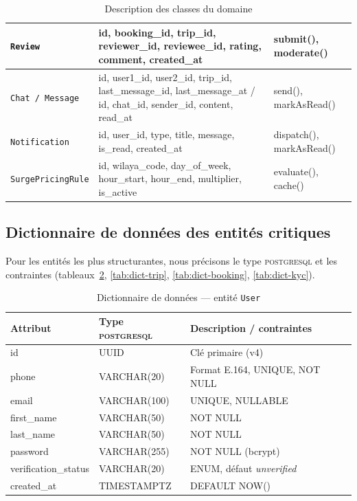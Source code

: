 \documentclass[12pt, a4paper, oneside]{report}
\begin{document}
\begin{table}[H]
\begin{tabularx}{\textwidth}{|l|X|X|}
\hline
\texttt{Review} & id, booking\_id, trip\_id, reviewer\_id, reviewee\_id, rating, comment, created\_at & submit(), moderate() \\
\hline
\texttt{Chat / Message} & id, user1\_id, user2\_id, trip\_id, last\_message\_id, last\_message\_at / id, chat\_id, sender\_id, content, read\_at & send(), markAsRead() \\
\hline
\texttt{Notification} & id, user\_id, type, title, message, is\_read, created\_at & dispatch(), markAsRead() \\
\hline
\texttt{SurgePricingRule} & id, wilaya\_code, day\_of\_week, hour\_start, hour\_end, multiplier, is\_active & evaluate(), cache() \\

\hline
\end{tabularx}
  \caption{Description des classes du domaine}
  \label{tab:classes}
\end{table}

\subsection{Dictionnaire de données des entités critiques}

Pour les entités les plus structurantes, nous précisons le type \textsc{postgresql} et les contraintes (tableaux~\ref{tab:dict-user}, \ref{tab:dict-trip}, \ref{tab:dict-booking}, \ref{tab:dict-kyc}).

\begin{table}[H]
\centering
\footnotesize
\begin{tabularx}{\textwidth}{|l|l|X|}
\hline
\rowcolor{rohlight}
\textbf{Attribut} & \textbf{Type \textsc{postgresql}} & \textbf{Description / contraintes} \\
\hline
id & UUID & Clé primaire (v4) \\
\hline
phone & VARCHAR(20) & Format E.164, UNIQUE, NOT NULL \\
\hline
email & VARCHAR(100) & UNIQUE, NULLABLE \\
\hline
first\_name & VARCHAR(50) & NOT NULL \\
\hline
last\_name & VARCHAR(50) & NOT NULL \\
\hline
password & VARCHAR(255) & NOT NULL (bcrypt) \\
\hline
verification\_status & VARCHAR(20) & ENUM, défaut \textit{unverified} \\
\hline
created\_at & TIMESTAMPTZ & DEFAULT NOW() \\
\hline
\end{tabularx}
  \caption{Dictionnaire de données --- entité \texttt{User}}
  \label{tab:dict-user}
\end{table}
\end{document}
